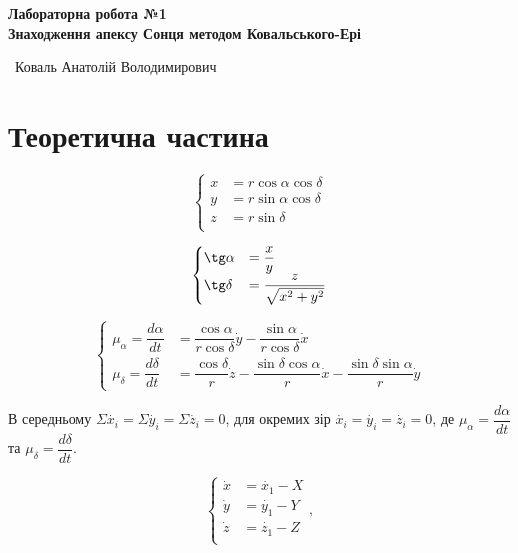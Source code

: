 \documentclass[12pt]{article}
\begin{document}
\fontsize{14}{14}\selectfont
\newpage

{\center \LARGE {\bf Лабораторна робота №1} \\}
{\center \large {\bf Знаходження апексу Сонця методом Ковальського-Ері} \\}

\begin{center}\
  Коваль Анатолій Володимирович \\
\end{center}

\section*{Теоретична частина}
  \begin{equation}
    \begin{cases}
      x &= r\cos\alpha\cos\delta \\
      y &= r\sin\alpha\cos\delta \\
      z &= r\sin\delta \\
    \end{cases}
  \end{equation}

  \begin{equation}
    \begin{cases}
      \tg\alpha &= \dfrac{x}{y} \\
      \tg\delta &= \dfrac{z}{\sqrt{x^2+y^2}} \\
    \end{cases}
  \end{equation}

  \begin{equation}
    \begin{cases}
      \mu_{\alpha}
      = \dfrac{d\alpha}{dt}
      &= \dfrac{\cos\alpha}{r\cos\delta}\dot{y} - \dfrac{\sin\alpha}{r\cos\delta}\dot{x} \\
      \mu_{\delta}
      = \dfrac{d\delta}{dt}
      &= \dfrac{\cos\delta}{r}\dot{z}
      - \dfrac{\sin\delta\cos\alpha}{r}\dot{x}
      - \dfrac{\sin\delta\sin\alpha}{r}\dot{y}
    \end{cases}
  \end{equation}

  В середньому $\Sigma\dot{x_i}=\Sigma\dot{y_i}=\Sigma\dot{z_i}=0$, для окремих зір $\dot{x_i}=\dot{y_i}=\dot{z_i}=0$, де $\mu_{\alpha} = \dfrac{d\alpha}{dt}$ та $\mu_{\delta} = \dfrac{d\delta}{dt}$.

  \begin{equation}
    \begin{cases}
      \dot{x} &= \dot{x_1} - X\\
      \dot{y} &= \dot{y_1} - Y\\
      \dot{z} &= \dot{z_1} - Z\\
    \end{cases},
  \end{equation}
\end{document}
